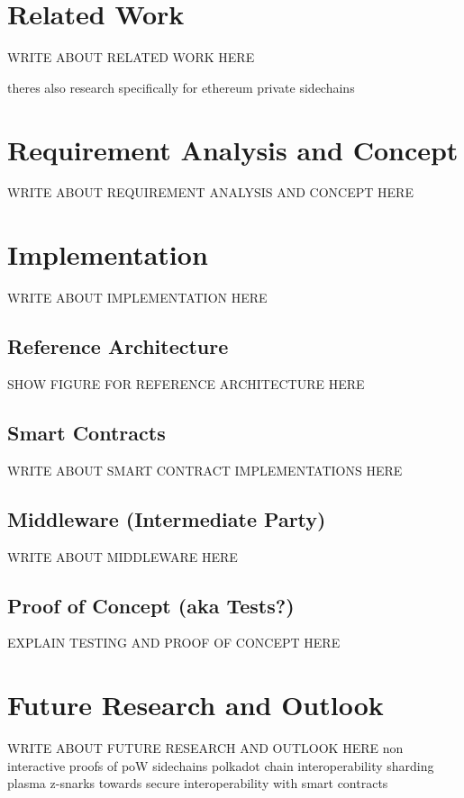 \chapter{Related Work}
\label{ch:chapter03}
WRITE ABOUT RELATED WORK HERE

theres also research specifically for ethereum private sidechains \cite{robinson2019atomic}




\chapter{Requirement Analysis and Concept}
\label{ch:chapter04}
WRITE ABOUT REQUIREMENT ANALYSIS AND CONCEPT HERE

\chapter{Implementation}
\label{ch:chapter05}
WRITE ABOUT IMPLEMENTATION HERE

\section{Reference Architecture}
\label{sec:chapter05:ref_architecture}

SHOW FIGURE FOR REFERENCE ARCHITECTURE HERE
%
%
\section{Smart Contracts}
\label{sec:chapter05:smartcontracts}
WRITE ABOUT SMART CONTRACT IMPLEMENTATIONS HERE

\section{Middleware (Intermediate Party)}
\label{sec:chapter05:middleware}
WRITE ABOUT MIDDLEWARE HERE

\section{Proof of Concept (aka Tests?)}
\label{sec:chapter05:poc}
EXPLAIN TESTING AND PROOF OF CONCEPT HERE

\chapter{Future Research and Outlook}
\label{ch:chapter06}
WRITE ABOUT FUTURE RESEARCH AND OUTLOOK HERE
non interactive proofs of poW \cite{kiayias2017non} sidechains \cite{kiayias2019proof} polkadot \cite{wood2016polkadot}  chain interoperability \cite{buterin2016chain} sharding \cite{buterin2017sharding} plasma \cite{poon2017plasma} z-snarks \cite{garoffolo2020zendoo} towards secure interoperability with smart contracts \cite{dagher2017towards}

